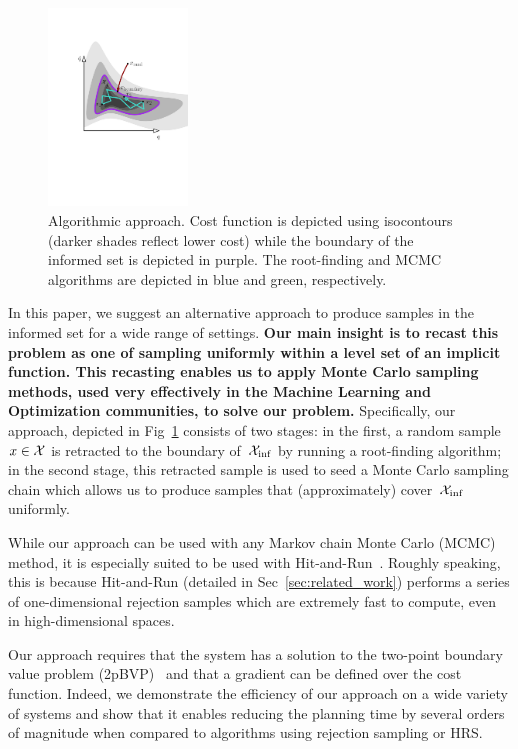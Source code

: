 \documentclass[letterpaper, 10 pt, conference]{ieeeconf}  %
\begin{document}
\begin{figure}[tb]
  \centering
  	\includegraphics[trim={4.5cm 0 4cm 2cm},clip,height = 5.25cm ]{fig/alg.pdf}
  \caption{
    \captionstyle
  	Algorithmic approach.
  	Cost function is depicted using isocontours (darker shades reflect lower cost) while the boundary of the informed set is depicted in purple. 
  	The root-finding and MCMC algorithms are depicted in blue and green, respectively.
  	}
   	\label{fig:alg}
\end{figure}


In this paper, we suggest an alternative approach to produce samples in the informed set \Cinf for a wide range of settings.
\textbf{
Our main insight is to recast this problem as one of sampling uniformly within a level set of an implicit function.
This recasting enables us to apply Monte Carlo sampling methods, used very effectively in the Machine Learning and Optimization communities, to solve our problem.
}
Specifically, our approach, depicted in Fig~\ref{fig:alg} consists of two stages:
in the first, a random sample $x \in \mathcal{X}$ is retracted to the boundary of~$\mathcal{X}_{\rm {inf}}$ by running a root-finding algorithm;
in the second stage, this retracted sample  is used to seed a Monte Carlo sampling chain which allows us to  produce samples that (approximately) cover~$\mathcal{X}_{\rm {inf}}$  uniformly.

While our approach can be used with any Markov chain Monte Carlo (MCMC) method, it is especially suited to be used with Hit-and-Run~\cite{S84,KSZ11}.
Roughly speaking, this is because Hit-and-Run (detailed in Sec~\ref{sec:related_work})
performs a series of one-dimensional rejection samples which are extremely fast to compute, even in high-dimensional spaces. 

Our approach requires that the system has a solution to the two-point boundary value problem (2pBVP)~\cite{L06, H02} and that a gradient can be defined over the cost function.
Indeed, we demonstrate the efficiency of our approach on a wide variety of systems and show that it enables reducing the planning time by several orders of magnitude when compared to algorithms using rejection sampling or HRS.
\end{document}
